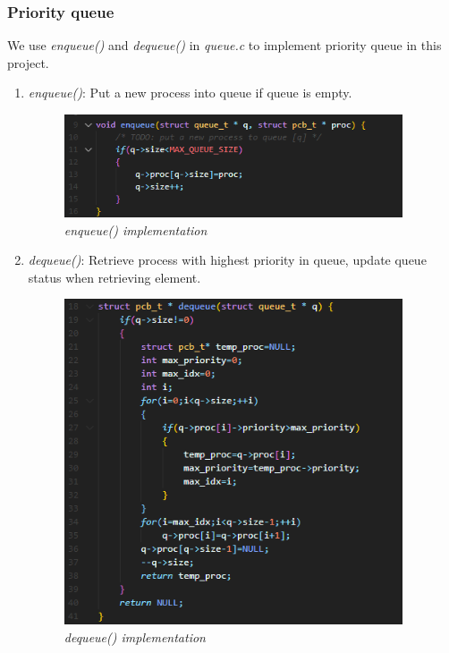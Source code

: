 \documentclass[13pt,a4paper]{article}
\begin{document}
			\subsubsection{Priority queue}
				We use \textit{enqueue()} and \textit{dequeue()} in \textit{queue.c} to implement priority queue in this project.
				\begin{enumerate}[-]
					\item \textit{enqueue()}: Put a new process into queue if queue is empty.
						\begin{figure}[h!]
							\begin{center}
								\includegraphics[width=10cm]{enqueue.png}
								\caption{\textit{enqueue() implementation}}
							\end{center}
						\end{figure}
					\item \textit{dequeue()}: Retrieve process with highest priority in queue, update queue status when retrieving element.
						\begin{figure}[h!]
							\begin{center}
								\includegraphics[width=10cm]{dequeue.png}
								\caption{\textit{dequeue() implementation}}
							\end{center}
						\end{figure}
				\end{enumerate}
			\newpage
\end{document}
